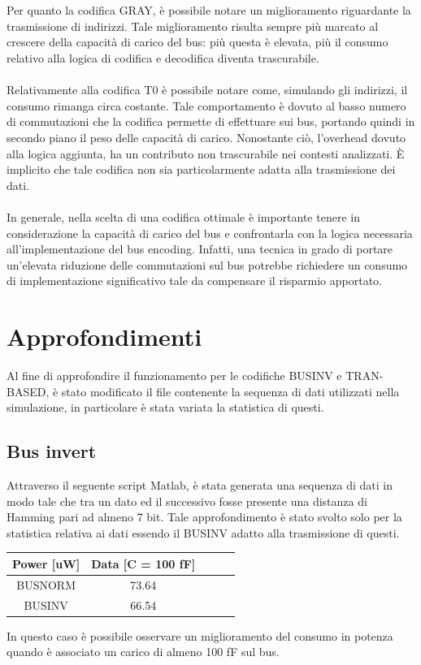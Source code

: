 \documentclass[11pt,  english, makeidx, a4paper, titlepage, oneside]{book}
\newenvironment{listato}{\footnotesize} {\normalsize }
\begin{document}
\\\\
Per quanto la codifica GRAY, è possibile notare un miglioramento riguardante la trasmissione di indirizzi. Tale miglioramento risulta sempre più marcato al crescere della capacità di carico del bus: più questa è elevata, più il consumo relativo alla logica di codifica e decodifica diventa trascurabile.
\\\\
Relativamente alla codifica T0 è possibile notare come, simulando gli indirizzi, il consumo rimanga circa costante. Tale comportamento è dovuto al basso numero di commutazioni che la codifica permette di effettuare sui bus, portando quindi in secondo piano il peso delle capacità di carico. Nonostante ciò, l'overhead dovuto alla logica aggiunta, ha un contributo non trascurabile nei contesti analizzati. È implicito che tale codifica non sia particolarmente adatta alla trasmissione dei dati.
\\\\
In generale, nella scelta di una codifica ottimale è importante tenere in considerazione la capacità di carico del bus e confrontarla con la logica necessaria all'implementazione del bus encoding. Infatti, una tecnica in grado di portare un'elevata riduzione delle commutazioni sul bus potrebbe richiedere un consumo di implementazione significativo tale da compensare il risparmio apportato.
\newpage
\section{Approfondimenti}
Al fine di approfondire il funzionamento per le codifiche BUSINV e TRAN-BASED, è stato modificato il file contenente la sequenza di dati utilizzati nella simulazione, in particolare è stata variata la statistica di questi.
\subsection{Bus invert}
Attraverso il seguente script Matlab, è stata generata una sequenza di dati in modo tale che tra un dato ed il successivo fosse presente una distanza di Hamming pari ad almeno 7 bit. Tale approfondimento è stato svolto solo per la statistica relativa ai dati essendo il BUSINV adatto alla trasmissione di questi.
\begin{center}
\begin{listato}
	\centerline{}
\end{listato}
\end{center}
\begin{center}
	\begin{tabular}{|c|c|c|c|c|}
	\hline
	Power [uW] & Data [C = 100 fF]\\
	\hline
	BUSNORM & 73.64\\
	 \hline
	BUSINV & 66.54\\
	\hline
	\end{tabular}	
\end{center}
\vspace{0.3cm}
In questo caso è possibile osservare un miglioramento del consumo in potenza quando è associato un carico di almeno 100 fF sul bus.
\end{document}
